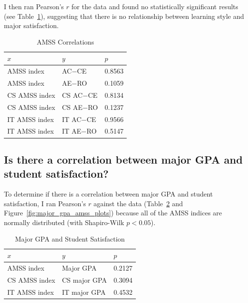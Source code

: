 I then ran Pearson's $r$ for the data and found no statistically significant results (see Table~\ref{tab:amss_corr}), suggesting that there is no relationship between learning style and major satisfaction.

\begin{table}[!hbtp]
  \centering
  \caption{AMSS Correlations}
  \label{tab:amss_corr}
  \begin{tabular}{lll}
    \toprule
    $x$           & $y$        & $p$ \\
    \midrule
    AMSS index    & AC$-$CE    & 0.8563 \\
    AMSS index    & AE$-$RO    & 0.1059 \\
    CS AMSS index & CS AC$-$CE & 0.8134 \\
    CS AMSS index & CS AE$-$RO & 0.1237 \\
    IT AMSS index & IT AC$-$CE & 0.9566 \\
    IT AMSS index & IT AE$-$RO & 0.5147 \\
    \bottomrule
  \end{tabular}
\end{table}

\subsection{Is there a correlation between major GPA and student satisfaction?}
To determine if there is a correlation between major GPA and student satisfaction, I ran Pearson's $r$ against the data (Table~\ref{tab:satisfaction} and Figure~\ref{fig:major_gpa_amss_plots}) because all of the AMSS indices are normally distributed (with Shapiro-Wilk $p<0.05$).

\begin{table}[!htbp]
  \centering
  \caption{Major GPA and Student Satisfaction}
  \label{tab:satisfaction}
  \begin{tabular}{lll}
    \toprule
    $x$           & $y$          & $p$ \\
    \midrule
    AMSS index    & Major GPA    & 0.2127 \\
    CS AMSS index & CS major GPA & 0.3094 \\
    IT AMSS index & IT major GPA & 0.4532 \\
    \bottomrule
  \end{tabular}
\end{table}

